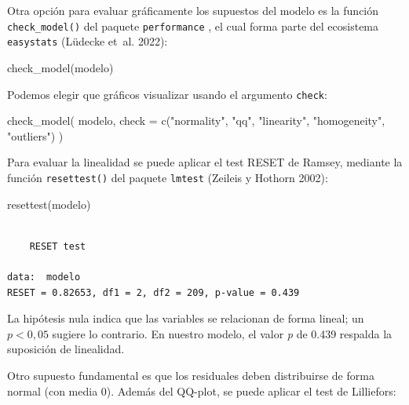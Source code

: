 \documentclass[
  spanish,
  a4paper,
]{scrbook}
\newenvironment{Shaded}{\begin{snugshade}}{\end{snugshade}}
\newcommand{\AttributeTok}[1]{\textcolor[rgb]{0.40,0.45,0.13}{#1}}
\newcommand{\FunctionTok}[1]{\textcolor[rgb]{0.28,0.35,0.67}{#1}}
\newcommand{\NormalTok}[1]{\textcolor[rgb]{0.00,0.23,0.31}{#1}}
\newcommand{\SpecialCharTok}[1]{\textcolor[rgb]{0.37,0.37,0.37}{#1}}
\newcommand{\StringTok}[1]{\textcolor[rgb]{0.13,0.47,0.30}{#1}}
\begin{document}
Otra opción para evaluar gráficamente los supuestos del modelo es la
función \texttt{check\_model()} del paquete \texttt{performance} , el
cual forma parte del ecosistema \texttt{easystats} (Lüdecke et~al.
2022):

\begin{Shaded}
\begin{Highlighting}[]
\FunctionTok{check\_model}\NormalTok{(modelo)}
\end{Highlighting}
\end{Shaded}

Podemos elegir que gráficos visualizar usando el argumento
\texttt{check}:

\begin{Shaded}
\begin{Highlighting}[]
\FunctionTok{check\_model}\NormalTok{(}
\NormalTok{  modelo,}
  \AttributeTok{check =} \FunctionTok{c}\NormalTok{(}\StringTok{"normality"}\NormalTok{, }\StringTok{"qq"}\NormalTok{, }\StringTok{"linearity"}\NormalTok{, }\StringTok{"homogeneity"}\NormalTok{, }\StringTok{"outliers"}\NormalTok{)}
\NormalTok{)}
\end{Highlighting}
\end{Shaded}

Para evaluar la linealidad se puede aplicar el test RESET de Ramsey,
mediante la función \texttt{resettest()} del paquete \texttt{lmtest}
(Zeileis y Hothorn 2002):

\begin{Shaded}
\begin{Highlighting}[]
\FunctionTok{resettest}\NormalTok{(modelo)}
\end{Highlighting}
\end{Shaded}

\begin{verbatim}

    RESET test

data:  modelo
RESET = 0.82653, df1 = 2, df2 = 209, p-value = 0.439
\end{verbatim}

La hipótesis nula indica que las variables se relacionan de forma
lineal; un \(p<0,05\) sugiere lo contrario. En nuestro modelo, el valor
\emph{p} de 0.439 respalda la suposición de linealidad.

Otro supuesto fundamental es que los residuales deben distribuirse de
forma normal (con media 0). Además del QQ-plot, se puede aplicar el test
de Lilliefors:

\begin{Shaded}
\end{Shaded}
\end{document}

